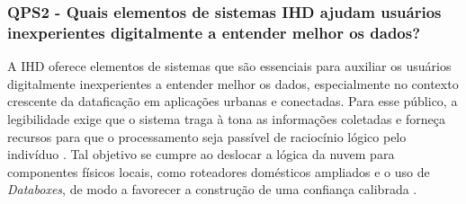 \documentclass[
	12pt,				%
	oneside,			%
	a4paper,			%
	english,			%
	brazil				%
	]{abntex2ppgsi}
\begin{document}




\subsubsection{QPS2 - Quais elementos de sistemas IHD ajudam usuários inexperientes digitalmente a entender melhor os dados?}

    A IHD oferece elementos de sistemas que são essenciais para auxiliar os usuários digitalmente inexperientes a entender melhor os dados, especialmente no contexto crescente da dataficação em aplicações urbanas e conectadas. Para esse público, a legibilidade exige que o sistema traga à tona as informações coletadas e forneça recursos para que o processamento seja passível de raciocínio lógico pelo indivíduo \cite{Crabtree2016}. Tal objetivo se cumpre ao deslocar a lógica da nuvem para componentes físicos locais, como roteadores domésticos ampliados e o uso de \textit{Databoxes}, de modo a favorecer a construção de uma confiança calibrada \cite{Coleti2024, Bowyer2022, Elhamdadi2022, Turkay2021, Crabtree2016}.
\end{document}
